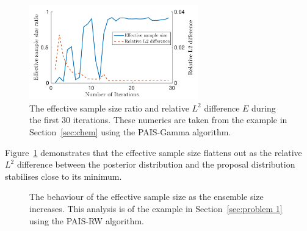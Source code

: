 \documentclass[final]{siamltex}
\begin{document}
\begin{figure}[htb]
\centering
\includegraphics[width=0.65\textwidth]{"figures/C1_burnin"}
\caption{The effective sample size ratio and relative $L^2$ difference
$E$ during the first 30 iterations. These numerics are taken from the
example in Section~\ref{sec:chem} using the PAIS-Gamma algorithm.}
\label{fig:neff-burnin}
\end{figure}

Figure~\ref{fig:neff-burnin} demonstrates that the effective sample
size flattens out as the relative $L^2$ difference between the
posterior distribution and the proposal distribution stabilises close
to its minimum.

\begin{figure}[htb]
\centering
{}
\caption{The behaviour of the effective sample size as the ensemble size increases. This analysis is of the example in Section~\ref{sec:problem 1} using the PAIS-RW algorithm.}
\label{fig:neff-M}
\end{figure}
\end{document}
